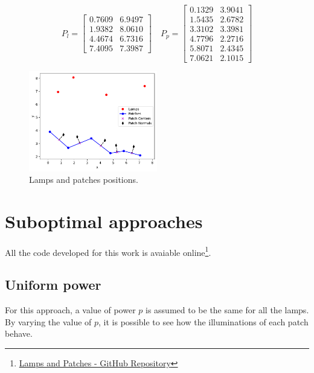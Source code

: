 \documentclass[11pt,a4paper]{article}
\begin{document}
\begin{equation*}
    P_l = \begin{bmatrix}
        0.7609 & 6.9497\\
        1.9382 & 8.0610\\
        4.4674 & 6.7316\\
        7.4095 & 7.3987
    \end{bmatrix}
    \quad
    P_{p} = \begin{bmatrix}
        0.1329 & 3.9041\\
        1.5435 & 2.6782\\
        3.3102 & 3.3981\\
        4.7796 & 2.2716\\
        5.8071 & 2.4345\\
        7.0621 & 2.1015
    \end{bmatrix}
    \label{eq:positions}
\end{equation*}

\begin{figure}[!htb]
    \centering
    \includegraphics[width=0.5\textwidth]{figures/lamps-patches-position.pdf}
    \caption{Lamps and patches positions.}\label{fig:lamps-patches-position}
\end{figure}

\newpage

\section{Suboptimal approaches}

All the code developed for this work is avaiable online\footnote{\href{https://github.com/felypemaciel/lamps/blob/main/lamps.ipynb}{Lamps and Patches - GitHub Repository}}.

\subsection{Uniform power}

For this approach, a value of power $p$ is assumed to be the same for all the lamps. By varying the value of $p$, it is possible to see how the illuminations of each patch behave.\\
\end{document}
